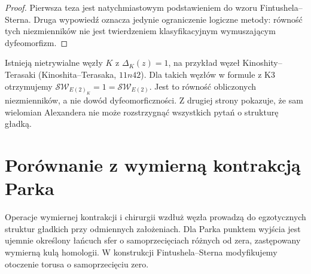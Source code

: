 \begin{proof}
Pierwsza teza jest natychmiastowym podstawieniem
do wzoru Fintushela--Sterna. Druga wypowiedź oznacza
jedynie ograniczenie logiczne metody: równość tych
niezmienników nie jest twierdzeniem klasyfikacyjnym
wymuszającym dyfeomorfizm.
\end{proof}

\begin{przyklad}
Istnieją nietrywialne węzły $K$ z $\Delta_K(z)=1$,
na przykład węzeł Kinoshity--Terasaki (Kinoshita--Terasaka, $11n42$).
Dla takich węzłów w formule z K3 otrzymujemy
$\mathcal{SW}_{E(2)_K}=1=\mathcal{SW}_{E(2)}$.
Jest to równość obliczonych niezmienników, a nie
dowód dyfeomorficzności. Z drugiej strony pokazuje,
że sam wielomian Alexandera nie może rozstrzygnąć
wszystkich pytań o strukturę gładką.
\end{przyklad}

\section{Porównanie z wymierną kontrakcją Parka}
\label{sec:tg-ks-compare}

Operacje wymiernej kontrakcji i chirurgii wzdłuż węzła
prowadzą do egzotycznych struktur gładkich przy
odmiennych założeniach. Dla Parka punktem wyjścia
jest ujemnie określony łańcuch sfer o samoprzecięciach
różnych od zera, zastępowany wymierną kulą homologii.
W konstrukcji Fintushela--Sterna modyfikujemy otoczenie
torusa o samoprzecięciu zero.

\begin{center}
\end{center}

